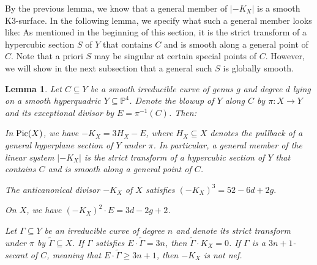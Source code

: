 \documentclass[english,11pt,reqno]{amsart}
\newcommand{\sub}{\subseteq}
\newcommand{\Pfour}{\mathbb{P}^4}
\newcommand{\Pic}{\textup{Pic}}
\newtheorem{lem}[thm]{Lemma}
\begin{document}
%
By the previous lemma, we know that a general member of $|-K_X|$ is a smooth K3-surface. In the following lemma, we specify what such a general member looks like: As mentioned in the beginning of this section, it is the strict transform of a hypercubic section $S$ of $Y$ that contains $C$ and is smooth along a general point of $C$. Note that a priori $S$ may be singular at certain special points of $C$. However, we will show in the next subsection that a general such $S$ is globally smooth.  
%
%
\begin{lem} \label{lem:anticanonical_divisor}
Let $C \sub Y$ be a smooth irreducible curve of genus $g$ and degree $d$ lying on a smooth hyperquadric $Y\sub \Pfour$. Denote the blowup of $Y$ along $C$ by $\pi:X\rightarrow Y$ and its exceptional divisor by $E=\pi^{-1}(C)$. Then:
\begin{enumlem}
\item \label{lem:formula_for_anticanonical_divisor}
In $\Pic(X)$, we have $-K_X = 3 H_X - E$, where $H_X\sub X$ denotes the pullback of a general hyperplane section of $Y$ under $\pi$. In particular, a general member of the linear system $|-K_X|$ is the strict transform of a hypercubic section of $Y$ that contains $C$ and is smooth along a general point of $C$.
\item \label{lem:cube_of_K_X}
The anticanonical divisor $-K_X$ of $X$ satisfies $(-K_X)^3 = 52-6d+2g.$
\item \label{lem:K_X_squared_times_E}
On $X$, we have $(-K_X)^2 \cdot E = 3d-2g+2$.
\item \label{lem:3n+1_secants} Let $\Gamma \sub Y$ be an irreducible curve of degree $n$ and denote its strict transform under $\pi$ by $\widetilde{\Gamma}\sub X$. If $\Gamma$ satisfies $E \cdot \widetilde{\Gamma}  =3n$, then $\widetilde{\Gamma}\cdot K_X=0$. If $\Gamma$ is a $3n+1$-secant of $C$, meaning that $E \cdot \widetilde{\Gamma}  \geq 3n+1$, then $-K_X$ is not nef. 
\end{enumlem}
\end{lem}
%
\end{document}
